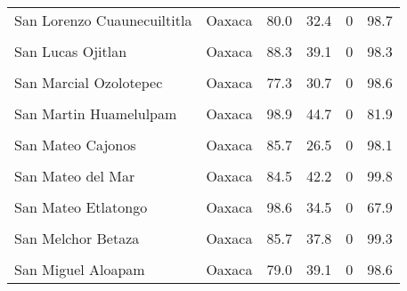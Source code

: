 \documentclass[
]{report}
\begin{document}
\begin{longtable}[t]{llrrrr}
San Lorenzo Cuaunecuiltitla & Oaxaca & 80.0 & 32.4 & 0 & 98.7\\
\cellcolor{gray!6}{San Lorenzo Victoria} & \cellcolor{gray!6}{Oaxaca} & \cellcolor{gray!6}{95.0} & \cellcolor{gray!6}{32.4} & \cellcolor{gray!6}{0} & \cellcolor{gray!6}{79.9}\\
San Lucas Ojitlan & Oaxaca & 88.3 & 39.1 & 0 & 98.3\\
\addlinespace
\cellcolor{gray!6}{San Lucas Quiavini} & \cellcolor{gray!6}{Oaxaca} & \cellcolor{gray!6}{78.0} & \cellcolor{gray!6}{36.1} & \cellcolor{gray!6}{0} & \cellcolor{gray!6}{92.9}\\
San Marcial Ozolotepec & Oaxaca & 77.3 & 30.7 & 0 & 98.6\\
\cellcolor{gray!6}{San Marcos Arteaga} & \cellcolor{gray!6}{Oaxaca} & \cellcolor{gray!6}{95.0} & \cellcolor{gray!6}{38.3} & \cellcolor{gray!6}{0} & \cellcolor{gray!6}{54.1}\\
San Martin Huamelulpam & Oaxaca & 98.9 & 44.7 & 0 & 81.9\\
\cellcolor{gray!6}{San Martin Tilcajete} & \cellcolor{gray!6}{Oaxaca} & \cellcolor{gray!6}{98.3} & \cellcolor{gray!6}{43.7} & \cellcolor{gray!6}{0} & \cellcolor{gray!6}{63.8}\\
\addlinespace
San Mateo Cajonos & Oaxaca & 85.7 & 26.5 & 0 & 98.1\\
\cellcolor{gray!6}{Capulalpam de Mendez} & \cellcolor{gray!6}{Oaxaca} & \cellcolor{gray!6}{98.8} & \cellcolor{gray!6}{45.4} & \cellcolor{gray!6}{0} & \cellcolor{gray!6}{79.7}\\
San Mateo del Mar & Oaxaca & 84.5 & 42.2 & 0 & 99.8\\
\cellcolor{gray!6}{San Mateo Yoloxochitlan} & \cellcolor{gray!6}{Oaxaca} & \cellcolor{gray!6}{85.0} & \cellcolor{gray!6}{40.3} & \cellcolor{gray!6}{0} & \cellcolor{gray!6}{97.6}\\
San Mateo Etlatongo & Oaxaca & 98.6 & 34.5 & 0 & 67.9\\
\addlinespace
\cellcolor{gray!6}{San Mateo Penasco} & \cellcolor{gray!6}{Oaxaca} & \cellcolor{gray!6}{77.1} & \cellcolor{gray!6}{32.6} & \cellcolor{gray!6}{0} & \cellcolor{gray!6}{96.5}\\
San Melchor Betaza & Oaxaca & 85.7 & 37.8 & 0 & 99.3\\
\cellcolor{gray!6}{San Miguel Achiutla} & \cellcolor{gray!6}{Oaxaca} & \cellcolor{gray!6}{98.1} & \cellcolor{gray!6}{26.8} & \cellcolor{gray!6}{0} & \cellcolor{gray!6}{76.4}\\
San Miguel Aloapam & Oaxaca & 79.0 & 39.1 & 0 & 98.6\\

\end{longtable}
\end{document}

